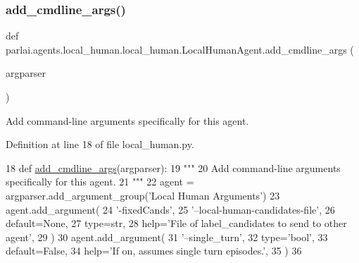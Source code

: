 \subsubsection{\texorpdfstring{add\+\_\+cmdline\+\_\+args()}{add\_cmdline\_args()}}
{\footnotesize\ttfamily def parlai.\+agents.\+local\+\_\+human.\+local\+\_\+human.\+Local\+Human\+Agent.\+add\+\_\+cmdline\+\_\+args (\begin{DoxyParamCaption}\item[{}]{argparser }\end{DoxyParamCaption})}

\begin{DoxyVerb}Add command-line arguments specifically for this agent.
\end{DoxyVerb}
 

Definition at line 18 of file local\+\_\+human.\+py.


\begin{DoxyCode}
18     \textcolor{keyword}{def }\hyperlink{namespaceparlai_1_1agents_1_1drqa_1_1config_a62fdd5554f1da6be0cba185271058320}{add\_cmdline\_args}(argparser):
19         \textcolor{stringliteral}{"""}
20 \textcolor{stringliteral}{        Add command-line arguments specifically for this agent.}
21 \textcolor{stringliteral}{        """}
22         agent = argparser.add\_argument\_group(\textcolor{stringliteral}{'Local Human Arguments'})
23         agent.add\_argument(
24             \textcolor{stringliteral}{'-fixedCands'},
25             \textcolor{stringliteral}{'--local-human-candidates-file'},
26             default=\textcolor{keywordtype}{None},
27             type=str,
28             help=\textcolor{stringliteral}{'File of label\_candidates to send to other agent'},
29         )
30         agent.add\_argument(
31             \textcolor{stringliteral}{'--single\_turn'},
32             type=\textcolor{stringliteral}{'bool'},
33             default=\textcolor{keyword}{False},
34             help=\textcolor{stringliteral}{'If on, assumes single turn episodes.'},
35         )
36 
\end{DoxyCode}
\mbox{\label{classparlai_1_1agents_1_1local__human_1_1local__human_1_1LocalHumanAgent_a5c598c26dfd30db3120dac0cf02daf67}} 
